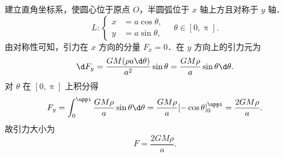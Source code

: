 \begin{solution}
    建立直角坐标系，使圆心位于原点 $O$，半圆弧位于 $x$ 轴上方且对称于 $y$ 轴．
    \begin{equation}
        L: \left\{ \begin{aligned} x &= a \cos \theta, \\ y &= a \sin \theta, \end{aligned} \right. \quad \theta \in [0, \uppi].
    \end{equation}
    由对称性可知，引力在 $x$ 方向的分量 $F_x = 0$．在 $y$ 方向上的引力元为
    \begin{equation}
        \d F_y = \frac{G M (\rho a \d \theta)}{a^2} \sin \theta = \frac{G M \rho}{a} \sin \theta \d \theta.
    \end{equation}
    对 $\theta$ 在 $[0, \uppi]$ 上积分得
    \begin{equation}
        F_y = \int_{0}^{\uppi} \frac{G M \rho}{a} \sin \theta \d \theta = \frac{G M \rho}{a} [-\cos \theta]_{0}^{\uppi} = \frac{2 G M \rho}{a}.
    \end{equation}
    故引力大小为
    \begin{equation}
        \boxed{F = \frac{2 G M \rho}{a}}.
    \end{equation}
\end{solution}

\endinput
